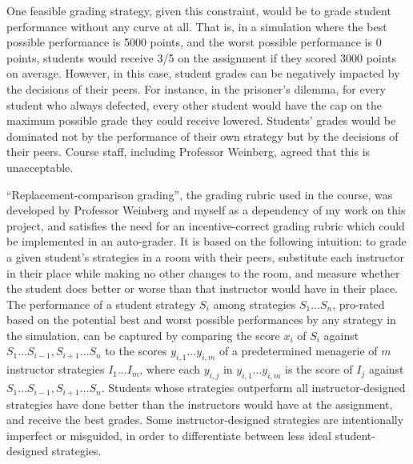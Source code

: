 \documentclass[pageno]{jpaper}
\begin{document}
One feasible grading strategy, given this constraint, would be to grade student performance without any curve at all.
That is, in a simulation where the best possible performance is 5000 points, and the worst possible performance is 0 points, students would receive 3/5 on the assignment if they scored 3000 points on average.
However, in this case, student grades can be negatively impacted by the decisions of their peers.
For instance, in the prisoner's dilemma, for every student who always defected, every other student would have the cap on the maximum possible grade they could receive lowered.
Students' grades would be dominated not by the performance of their own strategy but by the decisions of their peers.
Course staff, including Professor Weinberg, agreed that this is unacceptable.

``Replacement-comparison grading'', the grading rubric used in the course, was developed by Professor Weinberg and myself as a dependency of my work on this project, and satisfies the need for an incentive-correct grading rubric which could be implemented in an auto-grader.
It is based on the following intuition: to grade a given student's strategies in a room with their peers, substitute each instructor in their place while making no other changes to the room, and measure whether the student does better or worse than that instructor would have in their place.
The performance of a student strategy $S_i$ among strategies $S_1 \ldots S_n$, pro-rated based on the potential best and worst possible performances by any strategy in the simulation, can be captured by comparing the score $x_i$ of $S_i$ against $S_1 \ldots S_{i-1}, S_{i+1} \ldots S_n$ to the scores $y_{i,1} \ldots y_{i,m}$ of a predetermined menagerie of $m$ instructor strategies $I_1 \ldots I_m$, where each $y_{i,j}$ in $y_{i,1} \ldots y_{i,m}$ is the score of $I_j$ against $S_1 \ldots S_{i-1}, S_{i+1} \ldots S_n$.
Students whose strategies outperform all instructor-designed strategies have done better than the instructors would have at the assignment, and receive the best grades.
Some instructor-designed strategies are intentionally imperfect or misguided, in order to differentiate between less ideal student-designed strategies.
\end{document}
